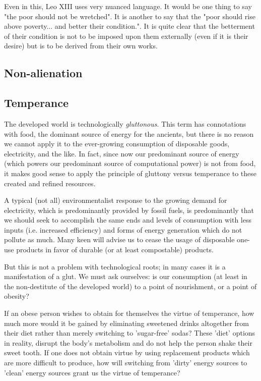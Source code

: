 \documentclass[letterpaper]{article}
\begin{document}
Even in this, Leo XIII uses very nuanced language. It would be one thing to say "the poor should not be wretched". It is another to say that the "poor should rise above poverty... and better their condition.".  It is quite clear that the betterment of their condition is not to be imposed upon them externally (even if it is their desire) but is to be derived from their own works.

\subsection{Non-alienation}

\subsection{Temperance}

The developed world is technologically \textit{gluttonous}. This term has connotations with food, the dominant source of energy for the ancients, but there is no reason we cannot apply it to the ever-growing consumption of disposable goods, electricity, and the like. In fact, since now our predominant source of energy (which powers our predominant source of computational power) is not from food, it makes good sense to apply the principle of gluttony versus temperance to these created and refined resources.

A typical (not all) environmentalist response to the growing demand for electricity, which is predominantly provided by fossil fuels, is predominantly that we should seek to accomplish the same ends and levels of consumption with less inputs (i.e. increased efficiency) and forms of energy generation which do not pollute as much. Many keen will advise us to cease the usage of disposable one-use products in favor of durable (or at least compostable) products.

But this is not a problem with technological roots; in many cases it is a manifestation of a glut. We must ask ourselves: is our consumption (at least in the non-destitute of the developed world) to a point of nourishment, or a point of obesity?

If an obese person wishes to obtain for themselves the virtue of temperance, how much more would it be gained by eliminating sweetened drinks altogether from their diet rather than merely switching to 'sugar-free' sodas? These 'diet' options in reality, disrupt the body's metabolism and do not help the person shake their sweet tooth. If one does not obtain virtue by using replacement products which are more difficult to produce, how will switching from 'dirty' energy sources to 'clean' energy sources grant us the virtue of temperance?
\end{document}
